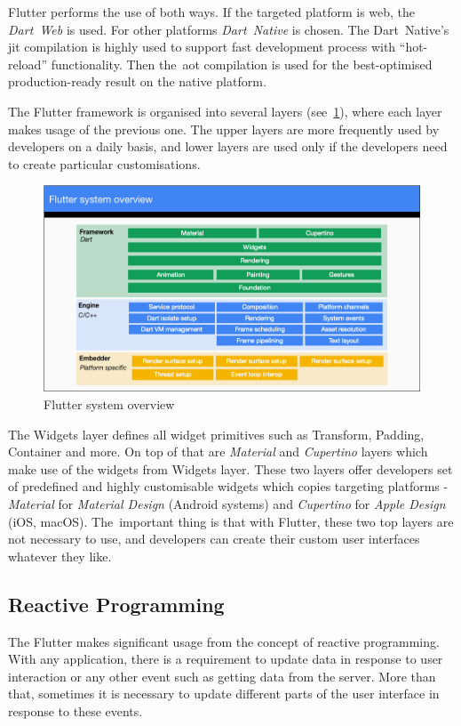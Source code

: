 Flutter performs the use of both ways. If the targeted platform is web, the \textit{Dart~Web} is used. For other platforms \textit{Dart~Native} is chosen. The Dart~Native's \gls{jit} compilation is highly used to support fast development process with ``hot-reload'' functionality. Then the~\gls{aot} compilation is used for the best-optimised production-ready result on the native platform.  

The Flutter framework is organised into several layers (see~\cref{fig:flutter-layer-cake}), where each layer makes usage of the previous one. The upper layers are more frequently used by developers on a daily basis, and lower layers are used only if the developers need to create particular customisations. 

\begin{figure}[htp]
    \centering
    \includegraphics[width=0.8\linewidth]{img/flutter/flutter-layer-cake.png}
    \caption{Flutter system overview~\cite{flutter-technical-overview}}
    \label{fig:flutter-layer-cake}
\end{figure}

The Widgets layer defines all widget primitives such as Transform, Padding, Container and more. On top of that are \textit{Material} and \textit{Cupertino} layers which make use of the widgets from Widgets layer. These two layers offer developers set of predefined and highly customisable widgets which copies targeting platforms - \textit{Material} for \textit{Material Design} (Android systems) and \textit{Cupertino} for \textit{Apple Design} (iOS, macOS).  The~important thing is that with Flutter, these two top layers are not necessary to use, and developers can create their custom user interfaces whatever they like. 

\subsection{Reactive Programming}
The Flutter makes significant usage from the concept of reactive programming. With any application, there is a requirement to update data in response to user interaction or any other event such as getting data from the server. More than that, sometimes it is necessary to update different parts of the user interface in response to these events. 

